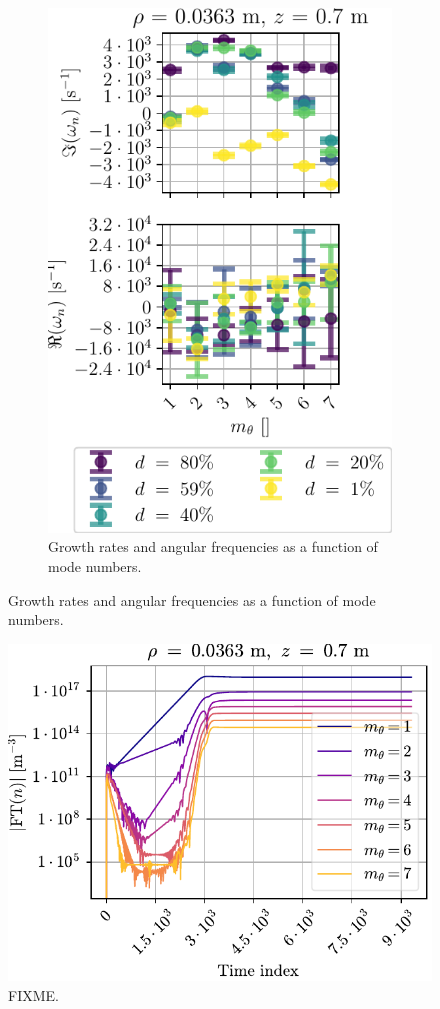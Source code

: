 \begin{figure}[htbp]
\begin{subfigure}[h]{0.45\textwidth}
        \includegraphics{fig/results/neutral/growthRatesNnScan}
        \caption{Growth rates and angular frequencies as a function of mode numbers.}
        \label{fig:grNn}
    \end{subfigure}%
\end{figure}
%

%
\begin{figure}[htb]
    \centering
    \includegraphics{fig/results/neutral/FFTnn1pct}
    \caption{FIXME.}
    \label{fig:FFTnn1pct}
\end{figure}
%


